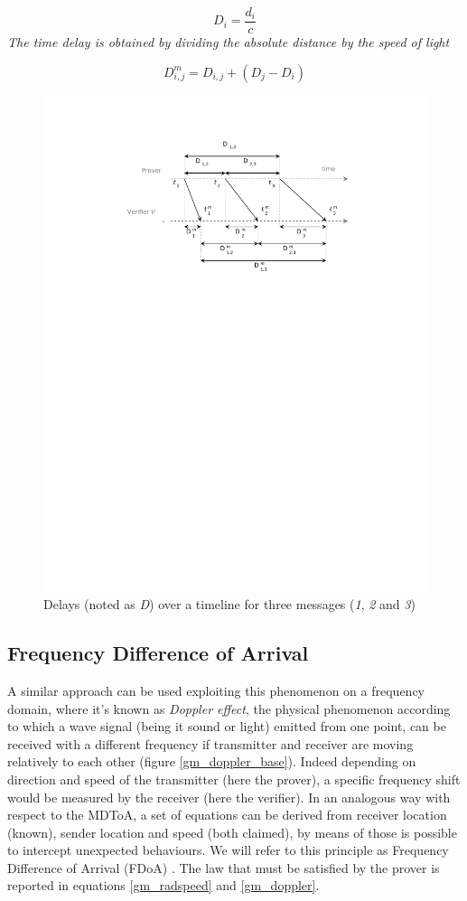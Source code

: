 \begin{equation}
    D_i = \frac{d_i}{c}
    \label{gm_delay}
\end{equation}
\emph{The time delay is obtained by dividing the absolute distance by the speed of light}

\begin{equation}
    D_{i,j}^m = D_{i,j} + (D_j - D_i)
    \label{gm_delay_trust}
\end{equation}

\begin{figure}
    \includegraphics[width=.47\textwidth,trim={46mm 177mm 40mm 20mm},clip]{gm_delay_pic}
    \caption{Delays (noted as \textit{D}) over a timeline for three messages (\textit{1}, \textit{2} and \textit{3})}
    \label{gm_delay_pic}
\end{figure}

\subsection{Frequency Difference of Arrival} \label{gm_sec_fdoa}

A similar approach can be used exploiting this phenomenon on a frequency domain, where it's known as \textit{Doppler effect}, the physical phenomenon according to which a wave signal (being it sound or light) emitted from one point, can be received with a different frequency if transmitter and receiver are moving relatively to each other (figure \ref{gm_doppler_base}). Indeed depending on direction and speed of the transmitter (here the prover), a specific frequency shift would be measured by the receiver (here the verifier). In an analogous way with respect to the MDToA, a set of equations can be derived from receiver location (known), sender location and speed (both claimed), by means of those is possible to intercept unexpected behaviours. We will refer to this principle as Frequency Difference of Arrival (FDoA) \cite{schaefer16} \cite{ghose15}. The law that must be satisfied by the prover is reported in equations \eqref{gm_radspeed} and \eqref{gm_doppler}.

